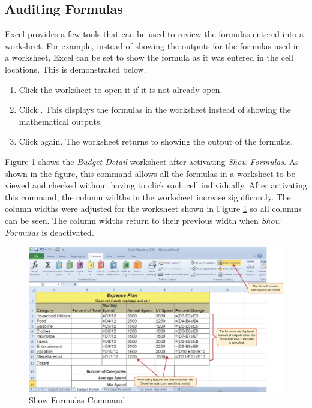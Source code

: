 \subsection{Auditing Formulas}

Excel provides a few tools that can be used to review the formulas entered into a worksheet. For example, instead of showing the outputs for the formulas used in a worksheet, Excel can be set to show the formula as it was entered in the cell locations. This is demonstrated below.

\begin{enumerate}
	\item Click the  worksheet to open it if it is not already open.
	\item Click . This displays the formulas in the worksheet instead of showing the mathematical outputs.
	\item Click  again. The worksheet returns to showing the output of the formulas.
\end{enumerate}

Figure \ref{02:fig08} shows the \textit{Budget Detail} worksheet after activating \textit{Show Formulas}. As shown in the figure, this command allows all the formulas in a worksheet to be viewed and checked without having to click each cell individually. After activating this command, the column widths in the worksheet increase significantly. The column widths were adjusted for the worksheet shown in Figure \ref{02:fig08} so all columns can be seen. The column widths return to their previous width when \textit{Show Formulas} is deactivated.

\begin{figure}[H]
	\centering
	\includegraphics[width=\maxwidth{.95\linewidth}]{gfx/ch02_fig08}
	\caption{Show Formulas Command}
	\label{02:fig08}
\end{figure}

